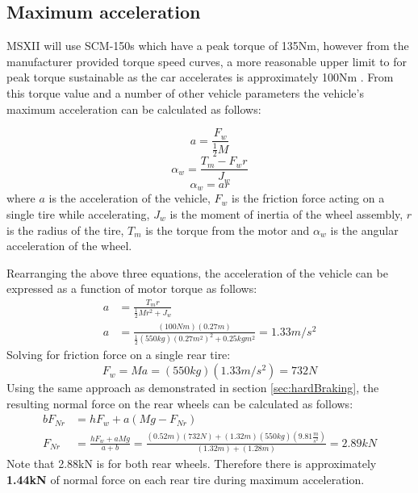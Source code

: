 \documentclass[12pt]{article}
\begin{document}
\subsection{Maximum acceleration}
MSXII will use SCM-150s which have a peak torque of 135Nm, however from the manufacturer provided torque speed curves, a more reasonable upper limit to for peak torque sustainable as the car accelerates is approximately 100Nm \cite{scm}. From this torque value and a number of other vehicle parameters the vehicle's maximum acceleration can be calculated as follows: 

\begin{equation}
	a = \frac{F_w}{\frac{1}{2}M}
\end{equation}
\begin{equation}
	\alpha_w = \frac{T_m - F_wr}{J_w}
\end{equation}
\begin{equation}
	\alpha_w = ar
\end{equation}
where $a$ is the acceleration of the vehicle, $F_w$ is the friction force acting on a single tire while accelerating, $J_w$ is the moment of inertia of the wheel assembly, $r$ is the radius of the tire, $T_m$ is the torque from the motor and $\alpha_w$ is the angular acceleration of the wheel. 

Rearranging the above three equations, the acceleration of the vehicle can be expressed as a function of motor torque as follows: 
\begin{equation}
\begin{split}
	a &= \frac{T_m r}{\frac{1}{2}Mr^2 + J_w} \\
	a &= \frac{(100Nm)(0.27m)}{\frac{1}{2}(550kg)(0.27m^2)^2 + 0.25kgm^2} = 1.33m/s^2
\end{split}
\end{equation}
Solving for friction force on a single rear tire: 
\begin{equation}
	F_w = Ma = (550kg)(1.33m/s^2) = 732N
\end{equation}
Using the same approach as demonstrated in section \ref{sec:hardBraking}, the resulting normal force on the rear wheels can be calculated as follows: 
\begin{equation}
\begin{split}
	bF_{Nr} &= hF_{w} + a(Mg - F_{Nr})\\
	F_{Nr} &= \frac{hF_{w} + aMg}{a+b} = \frac{(0.52m)(732N)+(1.32m)(550kg)\left(9.81\frac{m}{s^2}\right)}{(1.32m)+(1.28m)} = 2.89kN
\end{split}
\end{equation}
Note that 2.88kN is for both rear wheels. Therefore there is approximately \textbf{1.44kN} of normal force on each rear tire during maximum acceleration.
\end{document}
